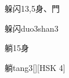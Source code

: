 \begin{entry}{躲闪}{13,5}{⾝、⾨}
  \begin{phonetics}{躲闪}{duo3shan3}
  \end{phonetics}
\end{entry}

\begin{entry}{躺}{15}{⾝}
  \begin{phonetics}{躺}{tang3}[][HSK 4]
  \end{phonetics}
\end{entry}


